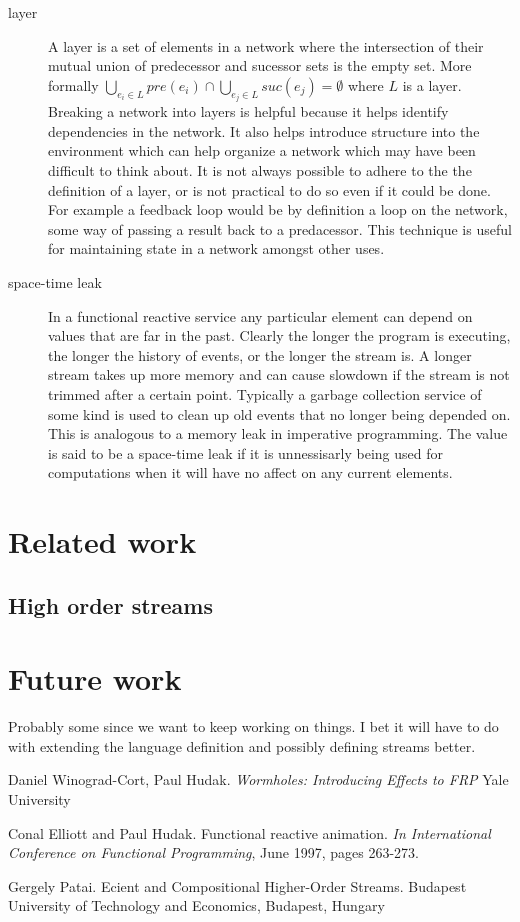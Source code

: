\documentclass[twocolumn]{paper}
\begin{document}
\begin{description}
\item[layer] A layer is a set of elements in a network where the intersection of their mutual union of predecessor and sucessor sets is the empty set. More formally $\bigcup_{e_i \in L}{pre(e_i)} \cap \bigcup_{e_j \in L}{suc(e_j)} = \emptyset$ where $L$ is a layer. Breaking a network into layers is helpful because it helps identify dependencies in the network. It also helps introduce structure into the environment which can help organize a network which may have been difficult to think about. It is not always possible to adhere to the the definition of a layer, or is not practical to do so even if it could be done. For example a feedback loop would be by definition a loop on the network, some way of passing a result back to a predacessor. This technique is useful for maintaining state in a network amongst other uses.


\item[space-time leak] In a functional reactive service any particular element can depend on values that are far in the past. Clearly the longer the program is executing, the longer the history of events, or the longer the stream is. A longer stream takes up more memory and can cause slowdown if the stream is not trimmed after a certain point. Typically a garbage collection service of some kind is used to clean up old events that no longer being depended on. This is analogous to a memory leak in imperative programming. The value is said to be a space-time leak if it is unnessisarly being used for computations when it will have no affect on any current elements.
\end{description}
\section{Related work}
\subsection{High order streams}
\cite{streams}
\section{Future work}
Probably some since we want to keep working on things. I bet it will have to do with extending the language definition and possibly defining streams better.
\begin{thebibliography}{9}
    Daniel Winograd-Cort, Paul Hudak.
    \emph{Wormholes: Introducing Effects to FRP}
    Yale University
    
    Conal Elliott and Paul Hudak. 
    Functional reactive animation.
    \emph{In International Conference on Functional Programming},
    June 1997, pages 263-273.

  Gergely Patai.
  Ecient and Compositional Higher-Order Streams.
  Budapest University of Technology and Economics, Budapest, Hungary



\end{thebibliography}
\end{document}
